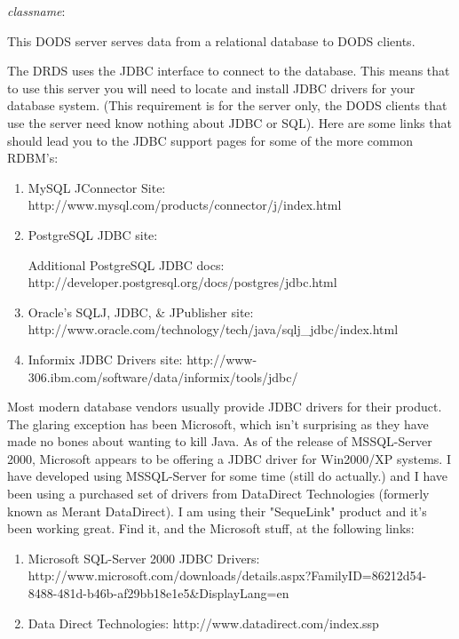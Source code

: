 \documentclass{dods-book}
\begin{document}
\emph{classname}: 

This DODS server serves data from a relational database to DODS clients.

The DRDS uses the JDBC interface to connect to the database. This means 
that to use this server you will need to locate and install JDBC drivers for your 
database system. (This requirement is for the server only, the DODS clients 
that use the server need know nothing about JDBC or SQL). Here are some 
links that should lead you to the JDBC support pages for some of the more 
common RDBM's:

\begin{enumerate}
\item MySQL JConnector Site: 
{http://www.mysql.com/products/connector/j/index.html}
\item PostgreSQL JDBC site: 

Additional PostgreSQL JDBC docs:
{http://developer.postgresql.org/docs/postgres/jdbc.html}
\item Oracle's SQLJ, JDBC, \& JPublisher site: 
{http://www.oracle.com/technology/tech/java/sqlj_jdbc/index.html}
\item Informix JDBC Drivers site: 
{http://www-306.ibm.com/software/data/informix/tools/jdbc/}
\end{enumerate}


Most modern database vendors usually provide JDBC drivers for their product. 
The glaring exception has been Microsoft, which isn't surprising as they have 
made no bones about wanting to kill Java. As of the release of MSSQL-Server 2000, 
Microsoft appears to be offering a JDBC driver for Win2000/XP systems. I have 
developed using MSSQL-Server for some time (still do actually.) and I have been 
using a purchased set of drivers from DataDirect Technologies (formerly known as 
Merant DataDirect). I am using their "SequeLink" product and it's been working great. 
Find it, and the Microsoft stuff, at the following links:

\begin{enumerate}
\item Microsoft SQL-Server 2000 JDBC Drivers:
{http://www.microsoft.com/downloads/details.aspx?FamilyID=86212d54-8488-481d-b46b-af29bb18e1e5\&DisplayLang=en}
\item Data Direct Technologies: 
{http://www.datadirect.com/index.ssp}
\end{enumerate}
\end{document}
